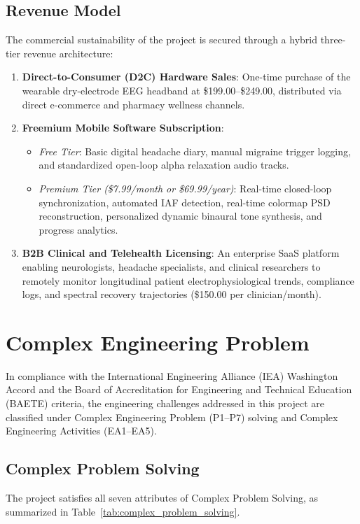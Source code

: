 \documentclass[12pt, a4paper]{report}
\begin{document}
\subsection{Revenue Model}
The commercial sustainability of the project is secured through a hybrid three-tier revenue architecture:
\begin{enumerate}
    \item \textbf{Direct-to-Consumer (D2C) Hardware Sales}: One-time purchase of the wearable dry-electrode EEG headband at \$199.00--\$249.00, distributed via direct e-commerce and pharmacy wellness channels.
    \item \textbf{Freemium Mobile Software Subscription}:
    \begin{itemize}
        \item \emph{Free Tier}: Basic digital headache diary, manual migraine trigger logging, and standardized open-loop alpha relaxation audio tracks.
        \item \emph{Premium Tier (\$7.99/month or \$69.99/year)}: Real-time closed-loop synchronization, automated IAF detection, real-time colormap PSD reconstruction, personalized dynamic binaural tone synthesis, and progress analytics.
    \end{itemize}
    \item \textbf{B2B Clinical and Telehealth Licensing}: An enterprise SaaS platform enabling neurologists, headache specialists, and clinical researchers to remotely monitor longitudinal patient electrophysiological trends, compliance logs, and spectral recovery trajectories (\$150.00 per clinician/month).
\end{enumerate}

\section{Complex Engineering Problem}
\label{sec:complex_engineering_problem}
In compliance with the International Engineering Alliance (IEA) Washington Accord and the Board of Accreditation for Engineering and Technical Education (BAETE) criteria, the engineering challenges addressed in this project are classified under Complex Engineering Problem (P1--P7) solving and Complex Engineering Activities (EA1--EA5).

\subsection{Complex Problem Solving}
\label{sec:complex_problem_solving}
The project satisfies all seven attributes of Complex Problem Solving, as summarized in Table~\ref{tab:complex_problem_solving}.
\end{document}
